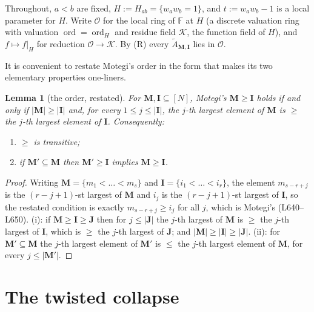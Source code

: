 \documentclass[11pt]{article}
\theoremstyle{plain}
\newtheorem{lem}[thm]{Lemma}
\theoremstyle{definition}
\theoremstyle{remark}
\theoremstyle{plain}
\newcommand{\bI}{\mathbf{I}}
\newcommand{\bM}{\mathbf{M}}
\newcommand{\bJ}{\mathbf{J}}
\newcommand{\At}{\widetilde{A}}
\newcommand{\ord}{\operatorname{ord}}
\begin{document}
Throughout, $a<b$ are fixed, $H:=H_{ab}=\{w_aw_b=1\}$, and
$t:=w_aw_b-1$ is a local parameter for $H$.  Write $\mathcal{O}$ for the local
ring of $\mathbb{F}$ at $H$ (a discrete valuation ring with valuation
$\ord=\ord_H$ and residue field $\mathcal{K}$, the function field of $H$), and
$f\mapsto f|_H$ for reduction $\mathcal{O}\to\mathcal{K}$.  By (R) every
$\At_{\bM,\bI}$ lies in $\mathcal{O}$.

It is convenient to restate Motegi's order in the form that makes its two
elementary properties one-liners.

\begin{lem}[the order, restated]\label{lem:order}
For $\bM,\bI\subseteq[N]$, Motegi's $\bM\ge\bI$ holds if and only if
$|\bM|\ge|\bI|$ and, for every $1\le j\le|\bI|$, the $j$-th largest element of
$\bM$ is $\ge$ the $j$-th largest element of $\bI$.  Consequently:
\begin{enumerate}
\item[(i)] $\ge$ is transitive;
\item[(ii)] if $\bM'\subseteq\bM$ then $\bM'\ge\bI$ implies $\bM\ge\bI$.
\end{enumerate}
\end{lem}
\begin{proof}
Writing $\bM=\{m_1<\dots<m_s\}$ and $\bI=\{i_1<\dots<i_r\}$, the element
$m_{s-r+j}$ is the $(r-j+1)$-st largest of $\bM$ and $i_j$ is the
$(r-j+1)$-st largest of $\bI$, so the restated condition is exactly
$m_{s-r+j}\ge i_j$ for all $j$, which is Motegi's (L640--L650).
(i): if $\bM\ge\bI\ge\bJ$ then for $j\le|\bJ|$ the $j$-th largest of $\bM$ is
$\ge$ the $j$-th largest of $\bI$, which is $\ge$ the $j$-th largest of $\bJ$;
and $|\bM|\ge|\bI|\ge|\bJ|$.
(ii): for $\bM'\subseteq\bM$ the $j$-th largest element of $\bM'$ is $\le$ the
$j$-th largest element of $\bM$, for every $j\le|\bM'|$.
\end{proof}

\section{The twisted collapse}
\label{sec:collapse}
\end{document}
